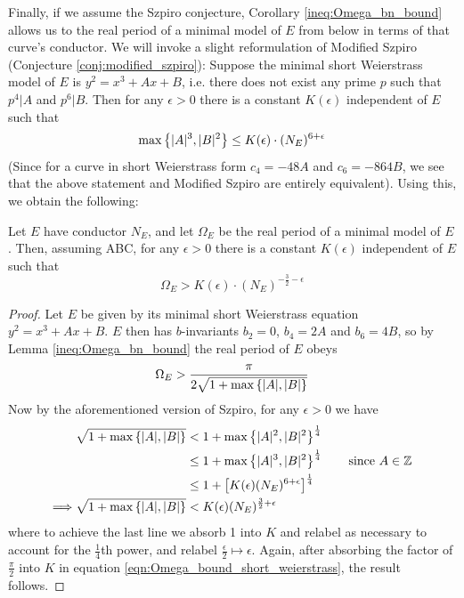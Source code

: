 \documentclass[10pt]{article}
\begin{document}
Finally, if we assume the Szpiro conjecture, Corollary \ref{ineq:Omega_bn_bound} allows us to the real period of a minimal model of $E$ from below in terms of that curve's conductor. We will invoke a slight reformulation of Modified Szpiro (Conjecture \ref{conj:modified_szpiro}): Suppose the minimal short Weierstrass model of $E$ is $y^2 = x^3+Ax+B$, i.e. there does not exist any prime $p$ such that $p^4|A$ and $p^6|B$. Then for any $\epsilon>0$ there is a constant $K(\epsilon)$ independent of $E$ such that
\begin{equation}
\max\left\{|A|^3,|B|^2\right\} \le K(\epsilon)\cdot (N_E)^{6+\epsilon}
\end{equation}
(Since for a curve in short Weierstrass form $c_4 = -48A$ and $c_6=-864B$, we see that the above statement and Modified Szpiro are entirely equivalent). Using this, we obtain the following:
\begin{proposition}
Let $E$ have conductor $N_E$, and let $\Omega_E$ be the real period of a minimal model of $E$. Then, assuming ABC, for any $\epsilon>0$ there is a constant $K(\epsilon)$ independent of $E$ such that 
\begin{equation}
\Omega_E > K(\epsilon) \cdot (N_E)^{-\frac{3}{2}-\epsilon}
\end{equation}
\end{proposition}
\begin{proof}
Let $E$ be given by its minimal short Weierstrass equation $y^2 = x^3+Ax+B$. $E$ then has $b$-invariants $b_2=0$, $b_4 = 2A$ and $b_6 = 4B$, so by Lemma \ref{ineq:Omega_bn_bound} the real period of $E$ obeys
\begin{equation}\label{eqn:Omega_bound_short_weierstrass}
\Omega_E > \frac{\pi}{2\sqrt{1+\max\left\{|A|,|B|\right\}}}
\end{equation}
Now by the aforementioned version of Szpiro, for any $\epsilon>0$ we have
\begin{align*}
\sqrt{1+\max\left\{|A|,|B|\right\}} &<  1 + \max\left\{|A|^2,|B|^2\right\}^\frac{1}{4} \\
&\le 1 + \max\left\{|A|^3,|B|^2\right\}^\frac{1}{4} \quad\quad\mbox{since $A \in \mathbb{Z}$} \\
&\le 1 +\left[K(\epsilon) (N_E)^{6+\epsilon} \right]^\frac{1}{4} \\
\Longrightarrow \sqrt{1+\max\left\{|A|,|B|\right\}} &< K(\epsilon) (N_E)^{\frac{3}{2}+\epsilon}
\end{align*}
where to achieve the last line we absorb 1 into $K$ and relabel as necessary to account for the $\frac{1}{4}$th power, and relabel $\frac{\epsilon}{2} \mapsto \epsilon$. Again, after absorbing the factor of $\frac{\pi}{2}$ into $K$ in equation \ref{eqn:Omega_bound_short_weierstrass}, the result follows.
\end{proof}
\end{document}
